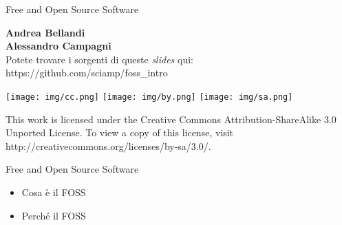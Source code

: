 \documentclass{beamer}
\begin{document}
  
\begin{frame}{Free and Open Source Software}

\textbf{Andrea Bellandi} \\
\textbf{Alessandro Campagni} \\

\hfill Potete trovare i sorgenti di queste \emph{slides} qui:\\
\hfill https://github.com/sciamp/foss\_intro

\vfill
\texttt{[image: img/cc.png]}
\texttt{[image: img/by.png]}
\texttt{[image: img/sa.png]}

This work is licensed under the Creative Commons Attribution-ShareAlike 3.0 Unported License. To view a copy of this license, visit http://creativecommons.org/licenses/by-sa/3.0/.
\end{frame}


\begin{frame}{Free and Open Source Software}

  \begin{itemize}
    \item Cosa \`e il FOSS
    \item Perch\'e il FOSS
  \end{itemize}

\end{frame}
\end{document}
